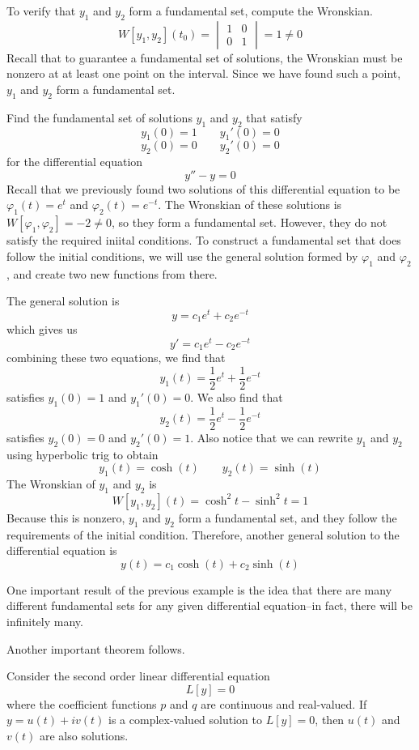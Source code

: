 To verify that $y_1$ and $y_2$ form a fundamental set, compute the Wronskian.
\[ W[y_1, y_2](t_0) = \begin{vmatrix}
    1 & 0 \\
    0 & 1
\end{vmatrix} = 1\neq 0\]
Recall that to guarantee a fundamental set of solutions, the Wronskian must be nonzero at at least one point on the interval. Since we have found such a point, $y_1$ and $y_2$ form a fundamental set.
\begin{example}
    Find the fundamental set of solutions $y_1$ and $y_2$ that satisfy
    \[ y_1(0) = 1 \quad \quad y_1'(0) = 0\]
    \[ y_2(0) = 0 \quad \quad y_2'(0) = 0\]
    for the differential equation
    \[ y'' - y = 0 \]
    Recall that we previously found two solutions of this differential equation to be $\varphi_1(t) = e^t$ and $\varphi_2(t) = e^{-t}$. The Wronskian of these solutions is $W[\varphi_1, \varphi_2] = -2 \neq 0$, so they form a fundamental set. However, they do not satisfy the required iniital conditions. To construct a fundamental set that does follow the initial conditions, we will use the general solution formed by $\varphi_1$ and $\varphi_2$, and create two new functions from there. \par
    The general solution is
    \[ y = c_1 e^t + c_2 e^{-t} \]
    which gives us
    \[ y' = c_1e^t - c_2e^{-t} \]
    combining these two equations, we find that 
    \[ y_1(t) = \frac{1}{2}e^t + \frac{1}{2}e^{-t} \]
    satisfies $y_1(0) = 1$ and $y_1'(0) = 0$. We also find that
    \[ y_2(t) = \frac{1}{2}e^t - \frac{1}{2}e^{-t} \]
    satisfies $y_2(0) = 0$ and $y_2'(0) = 1$. Also notice that we can rewrite $y_1$ and $y_2$ using hyperbolic trig to obtain
    \[ y_1(t) = \cosh(t) \quad \quad y_2(t) = \sinh(t)\]
    The Wronskian of $y_1$ and $y_2$ is 
    \[ W[y_1, y_2](t) = \cosh^2t - \sinh^2t = 1\]
    Because this is nonzero, $y_1$ and $y_2$ form a fundamental set, and they follow the requirements of the initial condition. Therefore, another general solution to the differential equation is
    \[ y(t) = c_1\cosh(t) + c_2\sinh(t)\]
\end{example}
One important result of the previous example is the idea that there are many different fundamental sets for any given differential equation--in fact, there will be infinitely many. \par
Another important theorem follows.
\begin{theorem} \label{imrealpart}
    Consider the second order linear differential equation
    \[ L[y] = 0 \]
    where the coefficient functions $p$ and $q$ are continuous and real-valued. If $y = u(t) + iv(t)$ is a complex-valued solution to $L[y] = 0$, then $u(t)$ and $v(t)$ are also solutions.
\end{theorem}
